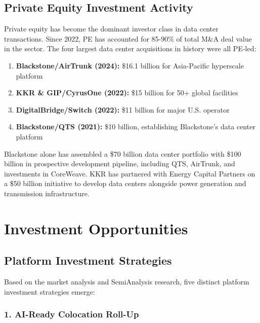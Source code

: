 \documentclass[11pt,a4paper]{article}
\begin{document}
\newpage

\subsection{Private Equity Investment Activity}

Private equity has become the dominant investor class in data center transactions. Since 2022, PE has accounted for 85-90\% of total M\&A deal value in the sector. The four largest data center acquisitions in history were all PE-led:

\begin{enumerate}[leftmargin=*, itemsep=4pt]
    \item \textbf{Blackstone/AirTrunk (2024):} \$16.1 billion for Asia-Pacific hyperscale platform
    \item \textbf{KKR \& GIP/CyrusOne (2022):} \$15 billion for 50+ global facilities
    \item \textbf{DigitalBridge/Switch (2022):} \$11 billion for major U.S. operator
    \item \textbf{Blackstone/QTS (2021):} \$10 billion, establishing Blackstone's data center platform
\end{enumerate}

Blackstone alone has assembled a \$70 billion data center portfolio with \$100 billion in prospective development pipeline, including QTS, AirTrunk, and investments in CoreWeave. KKR has partnered with Energy Capital Partners on a \$50 billion initiative to develop data centers alongside power generation and transmission infrastructure.

\newpage

\section{Investment Opportunities}

\subsection{Platform Investment Strategies}

Based on the market analysis and SemiAnalysis research, five distinct platform investment strategies emerge:

\subsubsection{1. AI-Ready Colocation Roll-Up}
\end{document}
